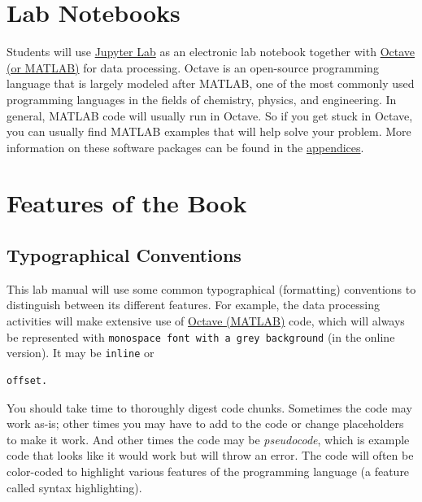 \documentclass[]{tufte-book}
\begin{document}
\hypertarget{lab-notebooks}{%
\section*{Lab Notebooks}\label{lab-notebooks}}

Students will use \href{https://jupyter.org/}{Jupyter Lab} as an electronic lab notebook together with \href{https://www.gnu.org/software/octave/}{Octave (or MATLAB)} for data processing. Octave is an open-source programming language that is largely modeled after MATLAB, one of the most commonly used programming languages in the fields of chemistry, physics, and engineering. In general, MATLAB code will usually run in Octave. So if you get stuck in Octave, you can usually find MATLAB examples that will help solve your problem. More information on these software packages can be found in the \href{/devel/chem370/lab-manual/appendix-1-getting-started-in-octave-and-jupyter-lab.html}{appendices}.

\hypertarget{features-of-the-book}{%
\section*{Features of the Book}\label{features-of-the-book}}

\hypertarget{typographical-conventions}{%
\subsection*{\texorpdfstring{\textbf{Typographical Conventions}}{Typographical Conventions}}\label{typographical-conventions}}

This lab manual will use some common typographical (formatting) conventions to distinguish between its different features. For example, the data processing activities will make extensive use of \href{https://www.gnu.org/software/octave/}{Octave (MATLAB)} code, which will always be represented with \texttt{monospace\ font\ with\ a\ grey\ background} (in the online version). It may be \texttt{inline} or

\begin{verbatim}
offset.
\end{verbatim}

You should take time to thoroughly digest code chunks. Sometimes the code may work as-is; other times you may have to add to the code or change placeholders to make it work. And other times the code may be \emph{pseudocode}, which is example code that looks like it would work but will throw an error. The code will often be color-coded to highlight various features of the programming language (a feature called syntax highlighting).
\end{document}

